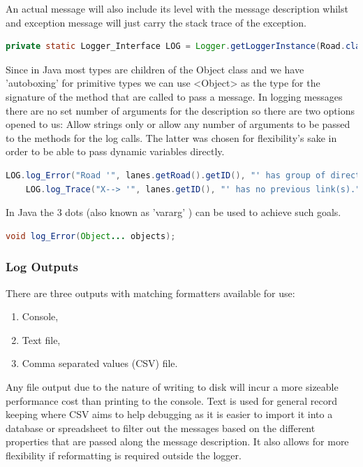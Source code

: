 An actual message will also include its level with the message description whilst and exception message will just carry the stack trace of the exception.

\begin{lstlisting}[language=java]
	private static Logger_Interface LOG = Logger.getLoggerInstance(Road.class.getSimpleName());
\end{lstlisting}

Since in Java most types are children of the Object class and we have 'autoboxing'\cite{Oracle1995} for primitive types we can use <Object> as the type for the signature of the method that are called to pass a message. In logging messages there are no set number of arguments for the description so there are two options opened to us: Allow strings only or allow any number of arguments to be passed to the methods for the log calls. The latter was chosen for flexibility's sake in order to be able to pass dynamic variables directly. 

\begin{lstlisting}[language=Java]
	LOG.log_Error("Road '", lanes.getRoad().getID(), "' has group of directed lanes with partly implemented Links (Back). ", link_count, "/", lanes.getNumberOfLanes(), " Lanes connected to a link.");
	LOG.log_Trace("X--> '", lanes.getID(), "' has no previous link(s).");
\end{lstlisting} 

In Java the 3 dots (also known as 'vararg' \cite{Oracle2004}) can be used to achieve such goals.

\begin{lstlisting}[language=Java]
	void log_Error(Object... objects);
\end{lstlisting}

\subsubsection{Log Outputs}
There are three outputs with matching formatters available for use:
\begin{enumerate}
	\item Console,
	\item Text file,
	\item Comma separated values (CSV) file.
\end{enumerate}

Any file output due to the nature of writing to disk will incur a more sizeable performance cost than printing to the console. Text is used for general record keeping where CSV aims to help debugging as it is easier to import it into a database or spreadsheet to filter out the messages based on the different properties that are passed along the message description. It also allows for more flexibility if reformatting is required outside the logger.



